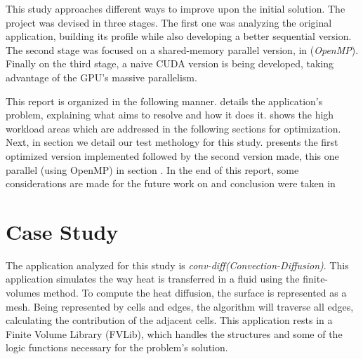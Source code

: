 \documentclass[a4paper,10pt,openright,openbib,twocolumn]{article}
\begin{document}
This study approaches different ways to improve upon the initial solution. The project was devised in three stages. The first one was analyzing the original application, building its profile while also developing a better sequential version. The second stage was focused on a shared-memory parallel version, in (\emph{OpenMP}). Finally on the third stage, a naive CUDA version is being developed, taking advantage of the GPU's massive parallelism.

This report is organized in the following manner.  details the application's problem, explaining what aims to resolve and how it does it.  shows the high workload areas which are addressed in the following sections for optimization. Next, in section  we detail our test methology for this study.   presents the first optimized version implemented followed by the second version made, this one parallel (using OpenMP) in section . In the end of this report, some considerations are made for the future work on  and conclusion were taken in 

\section{Case Study}    %
\label{sec:casestudy}
The application analyzed for this study is \emph{conv-diff(Convection-Diffusion)}. This application simulates the way heat is transferred in a fluid using the finite-volumes method. To compute the heat diffusion, the surface is represented as a mesh. Being represented by cells and edges, the algorithm will traverse all edges, calculating the contribution of the adjacent cells. This application rests in a Finite Volume Library (FVLib), which handles the structures and some of the logic functions necessary for the problem's solution. 
\end{document}
